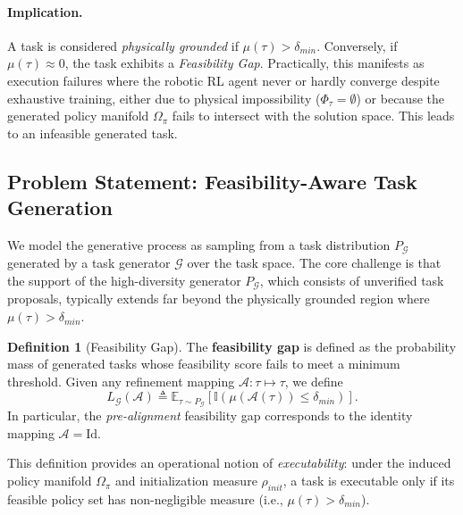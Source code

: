 \documentclass{article}
\theoremstyle{plain}
\theoremstyle{definition}
\newtheorem{definition}[theorem]{Definition}
\theoremstyle{remark}
\begin{document}
\paragraph{Implication.} A task is considered \textit{physically grounded} if $\mu(\tau) > \delta_{min}$. Conversely, if $\mu(\tau) \approx 0$, the task exhibits a \textit{Feasibility Gap}. Practically, this manifests as execution failures where the robotic RL agent never or hardly converge despite exhaustive training, either due to physical impossibility ($\Phi_\tau = \emptyset$) or because the generated policy manifold $\Omega_\pi$ fails to intersect with the solution space. This leads to an infeasible generated task.

\subsection{Problem Statement: Feasibility-Aware Task Generation}
\label{subsec:problem_statement}

We model the generative process as sampling from a task distribution $P_{\mathcal{G}}$ generated by a task generator $\mathcal{G}$ over the task space. The core challenge is that the support of the high-diversity generator $P_{\mathcal{G}}$, which consists of unverified task proposals, typically extends far beyond the physically grounded region where $\mu(\tau) > \delta_{min}$.

\begin{definition}[Feasibility Gap]
\label{def:feasibility_gap}
The \textbf{feasibility gap} is defined as the probability mass of generated tasks whose feasibility score fails to meet a minimum threshold. Given any refinement mapping $\mathcal{A}: \tau \mapsto \tau$, we define
\begin{equation}
    L_{\mathcal{G}}(\mathcal{A}) \triangleq \mathbb{E}_{\tau \sim P_{\mathcal{G}}} \left[ \mathbb{I}(\mu(\mathcal{A}(\tau)) \le \delta_{min}) \right].
\end{equation}
In particular, the \textit{pre-alignment} feasibility gap corresponds to the identity mapping $\mathcal{A} = \mathrm{Id}$.
\end{definition}

This definition provides an operational notion of \textit{executability}: under the induced policy manifold $\Omega_\pi$ and initialization measure $\rho_{init}$, a task is executable only if its feasible policy set has non-negligible measure (i.e., $\mu(\tau) > \delta_{min}$).
\end{document}

